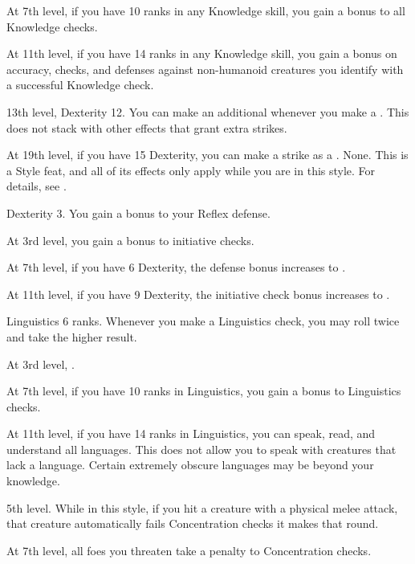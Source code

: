     At 7th level, if you have 10 ranks in any Knowledge skill, you gain a  bonus to all Knowledge checks.

    At 11th level, if you have 14 ranks in any Knowledge skill, you gain a  bonus on accuracy, checks, and defenses against non-humanoid creatures you identify with a successful Knowledge check.

    \featpres 13th level, Dexterity 12.
    \featben You can make an additional  whenever you make a  .
    This does not stack with other effects that grant extra strikes.

    At 19th level, if you have 15 Dexterity, you can make a strike as a .
    \stylereq None.
     This is a Style feat, and all of its effects only apply while you are in this style.
    For details, see .

    \featpre Dexterity 3.
    \featben You gain a  bonus to your Reflex defense.

    At 3rd level, you gain a  bonus to initiative checks.

    At 7th level, if you have 6 Dexterity, the defense bonus increases to .

    At 11th level, if you have 9 Dexterity, the initiative check bonus increases to .

    \featpre Linguistics 6 ranks.
    \featben Whenever you make a Linguistics check, you may roll twice and take the higher result.

    At 3rd level, \tdash.

    At 7th level, if you have 10 ranks in Linguistics, you gain a  bonus to Linguistics checks.

    At 11th level, if you have 14 ranks in Linguistics, you can speak, read, and understand all languages.
    This does not allow you to speak with creatures that lack a language.
    Certain extremely obscure languages may be beyond your knowledge.

    \featpre 5th level.
    \featben While in this style, if you hit a creature with a physical melee attack, that creature automatically fails Concentration checks it makes that round.

    At 7th level, all foes you threaten take a  penalty to Concentration checks.

